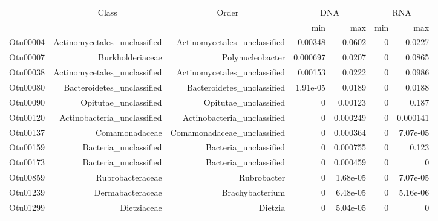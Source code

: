 \begin{table}[ht]
\centering
\begin{tabular}{crrrrrr}
  \hline
  & \multicolumn{1}{c}{Class} & \multicolumn{1}{c}{Order} & 
                      \multicolumn{2}{c}{DNA} & \multicolumn{2}{c}{RNA} \\
 & &  & min & max & min & max \\
 \hline
Otu00004 & Actinomycetales\_unclassified & Actinomycetales\_unclassified & 0.00348 & 0.0602 & 0 & 0.0227 \\ 
  Otu00007 & Burkholderiaceae & Polynucleobacter & 0.000697 & 0.0207 & 0 & 0.0865 \\ 
  Otu00038 & Actinomycetales\_unclassified & Actinomycetales\_unclassified & 0.00153 & 0.0222 & 0 & 0.0986 \\ 
  Otu00080 & Bacteroidetes\_unclassified & Bacteroidetes\_unclassified & 1.91e-05 & 0.0189 & 0 & 0.0188 \\ 
  Otu00090 & Opitutae\_unclassified & Opitutae\_unclassified & 0 & 0.00123 & 0 & 0.187 \\ 
  Otu00120 & Actinobacteria\_unclassified & Actinobacteria\_unclassified & 0 & 0.000249 & 0 & 0.000141 \\ 
  Otu00137 & Comamonadaceae & Comamonadaceae\_unclassified & 0 & 0.000364 & 0 & 7.07e-05 \\ 
  Otu00159 & Bacteria\_unclassified & Bacteria\_unclassified & 0 & 0.000755 & 0 & 0.123 \\ 
  Otu00173 & Bacteria\_unclassified & Bacteria\_unclassified & 0 & 0.000459 & 0 & 0 \\ 
  Otu00859 & Rubrobacteraceae & Rubrobacter & 0 & 1.68e-05 & 0 & 7.07e-05 \\ 
  Otu01239 & Dermabacteraceae & Brachybacterium & 0 & 6.48e-05 & 0 & 5.16e-06 \\ 
  Otu01299 & Dietziaceae & Dietzia & 0 & 5.04e-05 & 0 & 0 \\ 
   \hline
\end{tabular}
\end{table}
